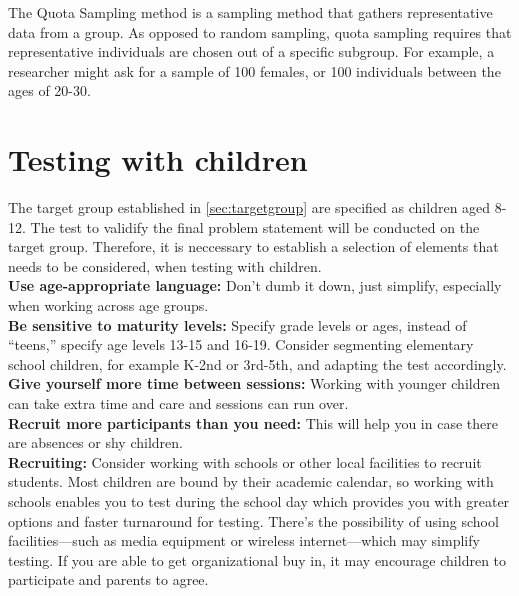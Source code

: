 The Quota Sampling method is a sampling method that gathers representative data from a group.\cite{quotaSamp} As opposed to random sampling, quota sampling requires that representative individuals are chosen out of a specific subgroup.\cite{quotaSamp} For example, a researcher might ask for a sample of 100 females, or 100 individuals between the ages of 20-30.\cite{quotaSamp}\\

\section{Testing with children}
The target group established in \autoref{sec:targetgroup} are specified as children aged 8-12. The test to validify the final problem statement will be conducted on the target group. Therefore, it is neccessary to establish a selection of elements that needs to be considered, when testing with children. \\

\textbf{Use age-appropriate language:} Don’t dumb it down, just simplify, especially when working across age groups.\cite{testwithkids}\\

\textbf{Be sensitive to maturity levels:} Specify grade levels or ages, instead of “teens,” specify age levels 13-15 and 16-19. Consider segmenting elementary school children, for example K-2nd or 3rd-5th, and adapting the test accordingly.\cite{testwithkids}\\

\textbf{Give yourself more time between sessions:} Working with younger children can take extra time and care and sessions can run over.\cite{testwithkids}\\

\textbf{Recruit more participants than you need:} This will help you in case there are absences or shy children.\cite{testwithkids}\\

\textbf{Recruiting:} Consider working with schools or other local facilities to recruit students. Most children are bound by their academic calendar, so working with schools enables you to test during the school day which provides you with greater options and faster turnaround for testing.  There’s the possibility of using school facilities—such as media equipment or wireless internet—which may simplify testing.  If you are able to get organizational buy in, it may encourage children to participate and parents to agree.\cite{testwithkids}\\

